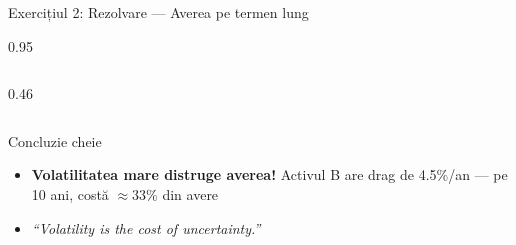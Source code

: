 \documentclass[9pt, aspectratio=169, t]{beamer}
\begin{document}
\begin{frame}[shrink=6]{Exercițiul 2: Rezolvare --- Averea pe termen lung}
\begin{cminipage}{0.95\textwidth}
\begin{columns}[T]
\begin{column}{0.46\textwidth}
\begin{center}
    \end{center}
    \end{column}
    \end{columns}
    \vspace{0.1cm}
    \begin{alertblock}{Concluzie cheie}
    \begin{itemize}\setlength{\itemsep}{0pt}
        \item \textbf{Volatilitatea mare distruge averea!} Activul B are drag de 4.5\%/an --- pe 10 ani, costă $\approx$33\% din avere
        \item \textit{``Volatility is the cost of uncertainty.''}
    \end{itemize}
    \end{alertblock}
    \end{cminipage}
\end{frame}
\end{document}
